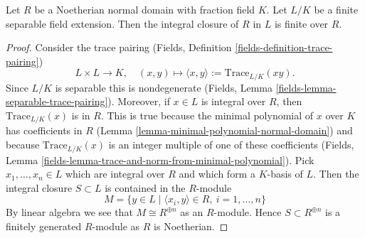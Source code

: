 \begin{lemma}
\label{lemma-Noetherian-normal-domain-finite-separable-extension}
Let $R$ be a Noetherian normal domain with fraction field $K$.
Let $L/K$ be a finite separable field extension.
Then the integral closure of $R$ in $L$ is finite over $R$.
\end{lemma}

\begin{proof}
Consider the trace pairing
(Fields, Definition \ref{fields-definition-trace-pairing})
$$
L \times L \longrightarrow K,
\quad (x, y) \longmapsto \langle x, y\rangle := \text{Trace}_{L/K}(xy).
$$
Since $L/K$ is separable this is nondegenerate
(Fields, Lemma \ref{fields-lemma-separable-trace-pairing}).
Moreover, if $x \in L$ is integral over $R$, then
$\text{Trace}_{L/K}(x)$ is in $R$. This is true because the
minimal polynomial of $x$ over $K$ has coefficients in $R$
(Lemma \ref{lemma-minimal-polynomial-normal-domain})
and because $\text{Trace}_{L/K}(x)$ is an
integer multiple of one of these coefficients
(Fields, Lemma \ref{fields-lemma-trace-and-norm-from-minimal-polynomial}).
Pick $x_1, \ldots, x_n \in L$ which are integral over $R$
and which form a $K$-basis of $L$. Then the integral closure
$S \subset L$ is contained in the $R$-module
$$
M = \{y \in L \mid \langle x_i, y\rangle \in R, \ i = 1, \ldots, n\}
$$
By linear algebra we see that $M \cong R^{\oplus n}$ as an $R$-module.
Hence $S \subset R^{\oplus n}$ is a finitely generated $R$-module
as $R$ is Noetherian.
\end{proof}
